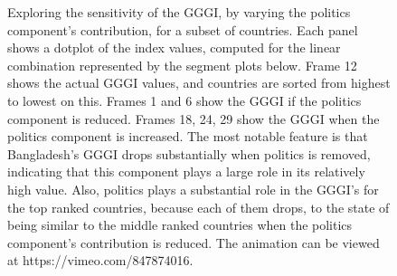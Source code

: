 \documentclass[
]{interact}
\begin{document}
\begin{figure}


\caption{\label{fig-idx-tour}Exploring the sensitivity of the GGGI, by
varying the politics component's contribution, for a subset of
countries. Each panel shows a dotplot of the index values, computed for
the linear combination represented by the segment plots below. Frame 12
shows the actual GGGI values, and countries are sorted from highest to
lowest on this. Frames 1 and 6 show the GGGI if the politics component
is reduced. Frames 18, 24, 29 show the GGGI when the politics component
is increased. The most notable feature is that Bangladesh's GGGI drops
substantially when politics is removed, indicating that this component
plays a large role in its relatively high value. Also, politics plays a
substantial role in the GGGI's for the top ranked countries, because
each of them drops, to the state of being similar to the middle ranked
countries when the politics component's contribution is reduced. The
animation can be viewed at https://vimeo.com/847874016.}

\end{figure}%
\end{document}
